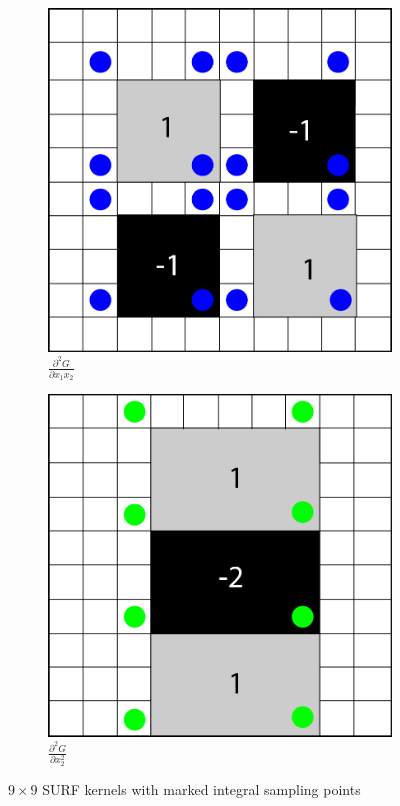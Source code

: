 \documentclass[sigconf]{acmart/acmart}
\begin{document}
\begin{figure}[h]
\begin{subfigure}[b]{0.3\textwidth}
		\includegraphics[width=\textwidth]{figures/hessian/gaussian_second_order_kernel_xy_integral}
		\caption{$\frac{\partial^2 G}{\partial x_1 x_2}$}
	\end{subfigure}
	\begin{subfigure}[b]{0.3\textwidth}
		\centering
		\includegraphics[width=\textwidth]{figures/hessian/gaussian_second_order_kernel_yy_integral}
		\caption{$\frac{\partial^2 G}{\partial x_2^2}$}
	\end{subfigure}
	\caption{$9 \times 9$ SURF kernels with marked integral sampling points}
	\label{fig_gaussian_integral_kernels}
\end{figure}
\end{document}
